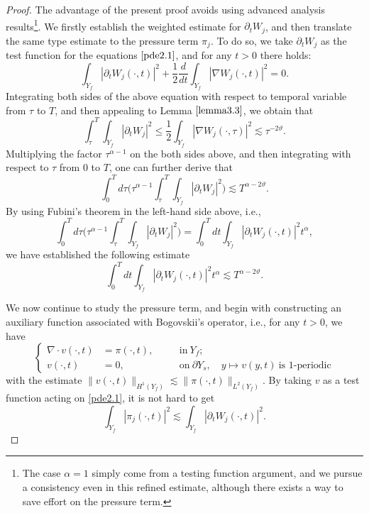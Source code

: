 \documentclass[13pt,CJK]{article}
\theoremstyle{plain}                       %
\theoremstyle{remark}
\numberwithin{equation}{section}
\begin{document}
\begin{proof}
The advantage of the present proof avoids using advanced analysis results\footnote{The case $\alpha =1$ simply come from a testing function argument, and
we pursue a consistency even in this refined estimate, although there exists
a way to save effort on the pressure term.}.
We firstly establish the weighted estimate for $\partial_t W_j$, and then translate
the same type estimate to the pressure term $\pi_j$. To do so, we take
$\partial_t W_j$ as the test function for the equations $\eqref{pde2.1}$, and for any $t>0$ there holds:
\begin{equation*}
\int_{Y_f}|\partial_t W_j(\cdot,t)|^2
+ \frac{1}{2}\frac{d}{dt}\int_{Y_f}|\nabla W_j(\cdot,t)|^2 = 0.
\end{equation*}
Integrating both sides of the above equation with respect to temporal variable from $\tau$ to $T$,
and then appealing to Lemma $\ref{lemma3.3}$, we obtain that
\begin{equation*}
 \int_{\tau}^{T}\int_{Y_f}|\partial_t W_j|^2
 \leq \frac{1}{2}\int_{Y_f}|\nabla W_j(\cdot,\tau)|^2
 \lesssim \tau^{-2\vartheta}.
\end{equation*}
Multiplying the factor $\tau^{\alpha-1}$ on the both sides above, and then integrating with respect to
$\tau$ from $0$ to $T$, one can further derive that
\begin{equation*}
\int_{0}^{T}d\tau
\bigg(\tau^{\alpha-1}\int_{\tau}^{T}\int_{Y_f}|\partial_t W_j|^2\bigg)
 \lesssim T^{\alpha-2\vartheta}.
\end{equation*}
By using Fubini's theorem in the left-hand side above, i.e.,
\begin{equation*}
\int_{0}^{T}d\tau
\bigg(\tau^{\alpha-1}\int_{\tau}^{T}\int_{Y_f}|\partial_t W_j|^2\bigg)
= \int_{0}^{T}dt\int_{Y_f}|\partial_t W_j(\cdot,t)|^2t^{\alpha},
\end{equation*}
we have established the following estimate
\begin{equation}\label{f:3.13}
 \int_{0}^{T}dt\int_{Y_f}|\partial_t W_j(\cdot,t)|^2t^{\alpha} \lesssim T^{\alpha-2\vartheta}.
\end{equation}

We now continue to study the pressure term, and begin with constructing
an auxiliary function associated with Bogovskii's operator, i.e., for any $t>0$, we have
\begin{equation*}
\left\{
\begin{aligned}
\nabla\cdot v(\cdot,t)&=\pi(\cdot,t),&\quad&\text{in}~Y_f;\\
v(\cdot,t)&=0,&\quad&\text{on}~\partial Y_s,\quad
y\mapsto
v(y,t)~\text{is 1-periodic}
\end{aligned}\right.
\end{equation*}
with the estimate $\|v(\cdot,t)\|_{H^1(Y_f)}
\lesssim\|\pi(\cdot,t)\|_{L^2(Y_f)}$.
By taking $v$ as a test function acting on \eqref{pde2.1}, it is not hard to
get
\begin{equation*}%
\int_{Y_f}|\pi_j(\cdot,t)|^2\lesssim\int_{Y_f}|\partial_t W_j(\cdot,t)|^2.
\end{equation*}


\end{proof}
\end{document}
